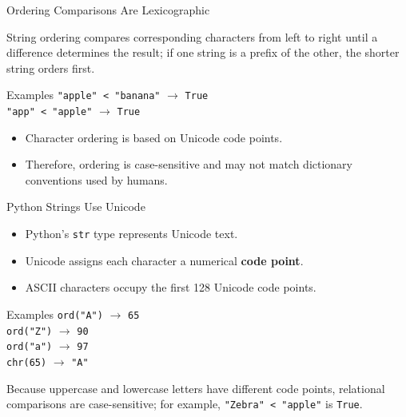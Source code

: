 \documentclass[aspectratio=169,10pt]{beamer}
\begin{document}
\begin{frame}{Ordering Comparisons Are Lexicographic}
  \begin{cpdefinition}
    String ordering compares corresponding characters from left to right until a difference determines the result; if one string is a prefix of the other, the shorter string orders first.
  \end{cpdefinition}

  \begin{block}{Examples}
    \texttt{"apple" < "banana"} $\longrightarrow$ \texttt{True}\\
    \texttt{"app" < "apple"} $\longrightarrow$ \texttt{True}
  \end{block}

  \begin{itemize}
    \item Character ordering is based on Unicode code points.
    \item Therefore, ordering is case-sensitive and may not match dictionary conventions used by humans.
  \end{itemize}
\end{frame}

\begin{frame}{Python Strings Use Unicode}
  \begin{itemize}
    \item Python's \texttt{str} type represents Unicode text.
    \item Unicode assigns each character a numerical \textbf{code point}.
    \item ASCII characters occupy the first 128 Unicode code points.
  \end{itemize}

  \begin{block}{Examples}
    \texttt{ord("A")} $\longrightarrow$ \texttt{65}\\
    \texttt{ord("Z")} $\longrightarrow$ \texttt{90}\\
    \texttt{ord("a")} $\longrightarrow$ \texttt{97}\\
    \texttt{chr(65)} $\longrightarrow$ \texttt{"A"}
  \end{block}

  \begin{keyidea}
    Because uppercase and lowercase letters have different code points, relational comparisons are case-sensitive; for example, \texttt{"Zebra" < "apple"} is \texttt{True}.
  \end{keyidea}
\end{frame}
\end{document}
